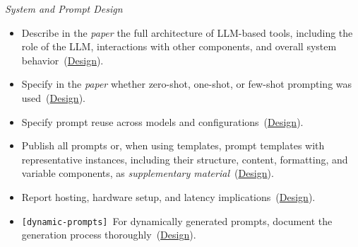 \documentclass[smallextended]{svjour3}
\makeatletter
\newcommand{\must}{\textbf{must}\xspace}
\newcommand{\paper}{\emph{paper}\xspace}
\newcommand{\supplementarymaterial}{\emph{supplementary material}\xspace}
\newcommand{\paper}{\emph{paper}\xspace}
\newcommand{\supplementarymaterial}{\emph{supplementary material}\xspace}
\newcommand{\iconM}{\usebox{\iconMbox}\xspace}
\newcommand{\iconM}{●\xspace}
\newcommand{\condition}[1]{\texttt{\small[#1]}\,}
\newcommand{\condition}[1]{@@cond:#1@@}
\newcommand{\refdesign}{\hyperref[sec:report-system-and-prompt-design]{Design}}
\newcommand{\refdesign}{\href{/guidelines/report-system-and-prompt-design/}{Design}}
\makeatother
\begin{document}
\begin{appendices}
\noindent\textit{System and Prompt Design}
\begin{itemize}[label={},leftmargin=*]
    \item \iconM Describe in the \paper the full architecture of LLM-based tools, including the role of the LLM, interactions with other components, and overall system behavior~(\refdesign).
    \item \iconM Specify in the \paper whether zero-shot, one-shot, or few-shot prompting was used~(\refdesign).
    \item \iconM Specify prompt reuse across models and configurations~(\refdesign).
    \item \iconM Publish all prompts or, when using templates, prompt templates with representative instances, including their structure, content, formatting, and variable components, as \supplementarymaterial~(\refdesign).
    \item \iconM Report hosting, hardware setup, and latency implications~(\refdesign).
    \item \iconM \condition{dynamic-prompts} For dynamically generated prompts, document the generation process thoroughly~(\refdesign).

\end{itemize}
\end{appendices}
\end{document}
